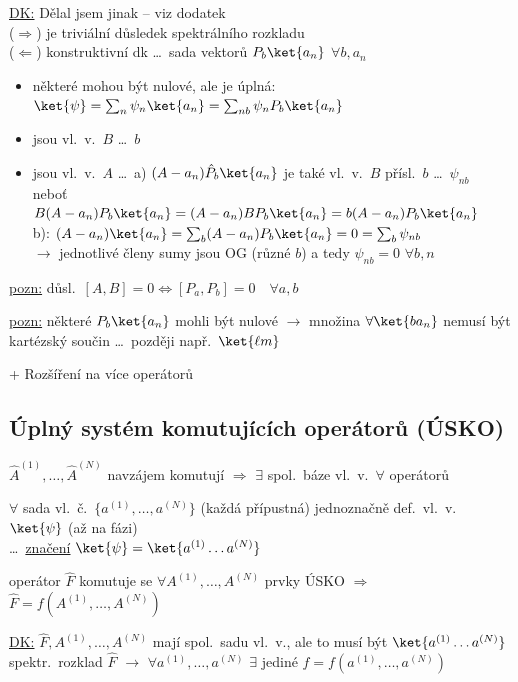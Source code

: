 \underline{DK:} \hfill {\color{red}Dělal jsem jinak -- viz dodatek} \\
\quad ($\Rightarrow$) je triviální důsledek spektrálního rozkladu \\
\quad ($\Leftarrow$) konstruktivní dk \dots\ sada vektorů $P_b\ket{a_n}$ $\forall b, a_n$
\begin{itemize}[nosep]
  \item[\dots] některé mohou být nulové, ale je úplná: \quad $\ket{\psi} = \sum_n\psi_n\ket{a_n} = \sum_{nb}\psi_nP_b\ket{a_n}$
  \item[\dots] jsou vl.\ v.\ $B$ \dots\ $b$
  \item[\dots] jsou vl.\ v.\ $A$ \dots\ a) $(A - a_n)\hat P_b\ket{a_n}$ je také vl.\ v.\ $B$ přísl.\ $b$ \dots\ $\psi_{nb}$ \\
        neboť \quad $B(A - a_n)P_b\ket{a_n} = (A - a_n)BP_b\ket{a_n} = b(A - a_n)P_b\ket{a_n}$ \\
        b): \quad $(A - a_n)\ket{a_n} = \sum_b(A - a_n)P_b\ket{a_n} = 0 = \sum_b\psi_{nb}$ \\
        $\to$ jednotlivé členy sumy jsou OG (různé $b$) a tedy $\psi_{nb} = 0$ $\forall b, n$
\end{itemize}

\underline{pozn:} důsl.\ \quad $[A,B] = 0 \Leftrightarrow [P_a,P_b] = 0\quad\forall a,b$ \\
\quad {}

\underline{pozn:} některé $P_b\ket{a_n}$ mohli být nulové $\to$ množina $\forall\ket{ba_n}$ nemusí být kartézský součin \dots\ později např.\ $\ket{\ell m}$

+ Rozšíření na více operátorů
\subsection*{Úplný systém komutujících operátorů (ÚSKO)}
$\hat A^{(1)},\dots,\hat A^{(N)}$ navzájem komutují $\Rightarrow$ $\exists$ spol.\ báze vl.\ v.\ $\forall$ operátorů

\begin{definice}[ÚSKO]
$\forall$ sada vl.\ č.\ $\{a^{(1)},\dots,a^{(N)}\}$ (každá přípustná) jednoznačně def.\ vl.\ v.\ $\ket{\psi}$ (až na fázi) \\
\dots\ \underline{značení} \quad $\ket{\psi} = \ket{a^{(1)}\dots a^{(N)}}$
\end{definice}

\begin{veta}
operátor $\hat F$ komutuje se $\forall A^{(1)},\dots,A^{(N)}$ prvky ÚSKO $\Rightarrow$ $\hat F = f(A^{(1)},\dots,A^{(N)})$
\end{veta}
\underline{DK:} $\hat F, A^{(1)},\dots,A^{(N)}$ mají spol.\ sadu vl.\ v., ale to musí být $\ket{a^{(1)}\dots a^{(N)}}$ \\
\quad spektr.\ rozklad $\hat F$ $\to$ $\forall a^{(1)},\dots,a^{(N)}$ $\exists$ jediné $f = f(a^{(1)},\dots,a^{(N)})$

